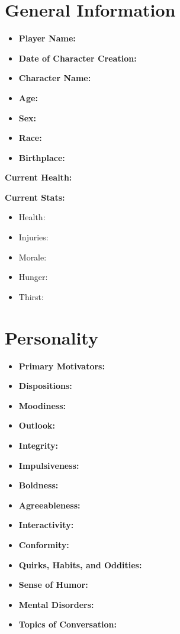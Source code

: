 \documentclass{article}
\begin{document}
\section*{General Information}
\begin{itemize}
    \item \textbf{Player Name:} \hrulefill
    \item \textbf{Date of Character Creation:} \hrulefill
    \item \textbf{Character Name:} \hrulefill
    \item \textbf{Age:} \hrulefill
    \item \textbf{Sex:} \hrulefill
    \item \textbf{Race:} \hrulefill
    \item \textbf{Birthplace:} \hrulefill
\end{itemize}

\vspace{0.5cm}
\textbf{Current Health:} \hrulefill

\textbf{Current Stats:}
\begin{itemize}
    \item Health: \hrulefill
    \item Injuries: \hrulefill
    \item Morale: \hrulefill
    \item Hunger: \hrulefill
    \item Thirst: \hrulefill
\end{itemize}

\newpage

\section*{Personality}
\begin{itemize}
    \item \textbf{Primary Motivators:} \hrulefill
    \item \textbf{Dispositions:} \hrulefill
    \item \textbf{Moodiness:} \hrulefill
    \item \textbf{Outlook:} \hrulefill
    \item \textbf{Integrity:} \hrulefill
    \item \textbf{Impulsiveness:} \hrulefill
    \item \textbf{Boldness:} \hrulefill
    \item \textbf{Agreeableness:} \hrulefill
    \item \textbf{Interactivity:} \hrulefill
    \item \textbf{Conformity:} \hrulefill
    \item \textbf{Quirks, Habits, and Oddities:} \hrulefill
    \item \textbf{Sense of Humor:} \hrulefill
    \item \textbf{Mental Disorders:} \hrulefill
    \item \textbf{Topics of Conversation:} \hrulefill
\end{itemize}
\end{document}
